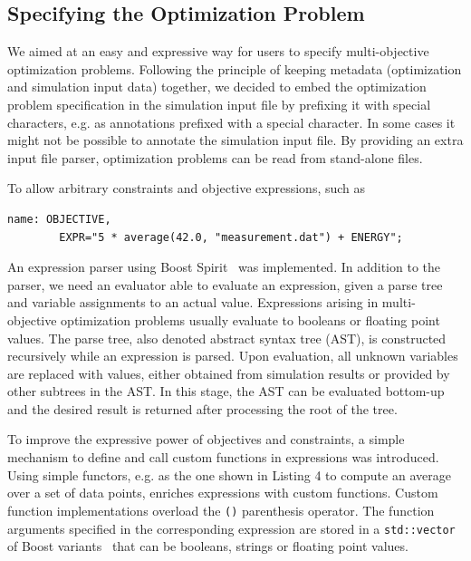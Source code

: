 \documentclass[preprint,linenumbers,amsmath,amssymb,aps,prstab]{revtex4-1}%
\begin{document}
\subsection{Specifying the Optimization Problem}

We aimed at an easy and expressive way for users to specify multi-objective
  optimization problems.
Following the principle of keeping metadata (optimization and simulation
  input data) together, we decided to embed the optimization problem
  specification in the simulation input file by prefixing it with special
  characters, e.g. as annotations prefixed with a special character.
In some cases it might not be possible to annotate the simulation input file.
By providing an extra input file parser, optimization problems can be read
  from stand-alone files.

To allow arbitrary constraints and objective expressions, such as
%
\begin{Verbatim}[fontsize=\scriptsize]
  name: OBJECTIVE,
        EXPR="5 * average(42.0, "measurement.dat") + ENERGY";
\end{Verbatim}
%
\noindent
  An expression parser using Boost Spirit~\cite{boost} was implemented.
In addition to the parser, we need an evaluator able to evaluate an expression,
  given a parse tree and variable assignments to an actual value.
Expressions arising in multi-objective optimization problems usually evaluate
  to booleans or floating point values.
The parse tree, also denoted abstract syntax tree (AST), is constructed
  recursively while an expression is parsed.
Upon evaluation, all unknown variables are replaced with values, either
  obtained from simulation results or provided by other subtrees in the AST.
In this stage, the AST can be evaluated bottom-up and the desired result is
  returned after processing the root of the tree.

To improve the expressive power of objectives and constraints, a
  simple mechanism to define and call custom functions in expressions was introduced.
Using simple functors, e.g. as the one shown in Listing 4 to compute an
  average over a set of data points, enriches expressions with custom
  functions.
Custom function implementations overload the \texttt{()} parenthesis operator.
The function arguments specified in the corresponding expression are stored in
  a \texttt{std::vector} of Boost variants~\cite{boost2} that can be
  booleans, strings or floating point values.
\end{document}
